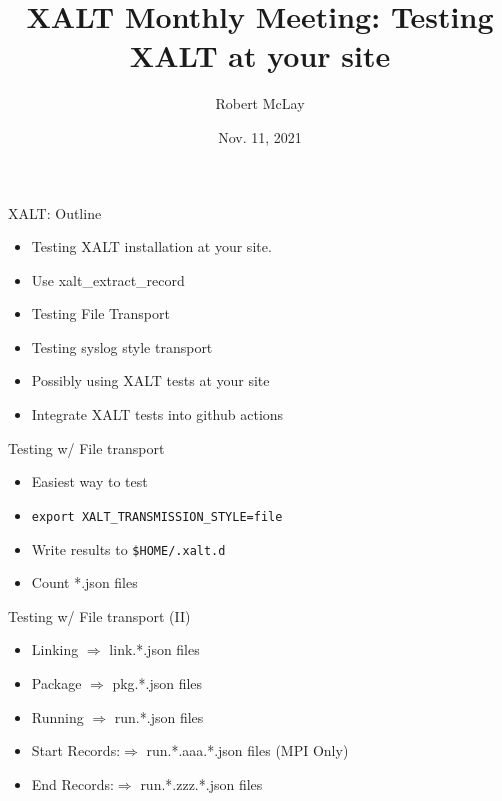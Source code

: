 \documentclass{beamer}
\begin{document}
\title[XALT]{XALT Monthly Meeting: Testing XALT at your site}
\author{Robert McLay} 
\date{Nov. 11, 2021} 

\frame{\titlepage} 

\begin{frame}{XALT: Outline}
  \begin{itemize}
    \item Testing XALT installation at your site.
    \item Use xalt\_extract\_record 
    \item Testing File Transport
    \item Testing syslog style transport
    \item Possibly using XALT tests at your site
    \item Integrate XALT tests into github actions
  \end{itemize}
\end{frame}

\begin{frame}{Testing w/ File transport}
  \begin{itemize}
    \item Easiest way to test
    \item \texttt{export XALT_TRANSMISSION_STYLE=file}
    \item Write results to \texttt{\$HOME/.xalt.d}
    \item Count *.json files
  \end{itemize}
\end{frame}

\begin{frame}{Testing w/ File transport (II)}
  \begin{itemize}
    \item Linking $\Rightarrow$ link.*.json files 
    \item Package $\Rightarrow$ pkg.*.json files 
    \item Running $\Rightarrow$ run.*.json files 
    \item Start Records:$\Rightarrow$ run.*.aaa.*.json files (MPI Only)
    \item End Records:$\Rightarrow$ run.*.zzz.*.json files 
  \end{itemize}
\end{frame}
\end{document}
